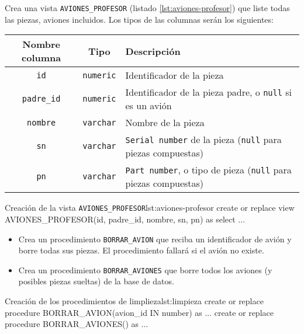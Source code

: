 \begin{homeworkProblem}

  Crea una vista \texttt{AVIONES\_PROFESOR} (listado \ref{lst:aviones-profesor}) que liste todas las piezas, aviones incluidos. Los tipos de las columnas serán los siguientes:
  
  \begin{center}
    \begin{tabular}{|c|c|p{10cm}|}
      \hline
      \textbf{Nombre columna} & \textbf{Tipo} & \textbf{Descripción} \\ 
      \hline
      \texttt{id} & \texttt{numeric} & Identificador de la pieza \\
      \texttt{padre\_id} & \texttt{numeric} & Identificador de la pieza padre, o \texttt{null} si es un avión\\
      \texttt{nombre} & \texttt{varchar} & Nombre de la pieza \\
      \texttt{sn} & \texttt{varchar} & \texttt{Serial number} de la pieza (\texttt{null} para piezas compuestas)\\
      \texttt{pn} & \texttt{varchar} & \texttt{Part number}, o tipo de pieza (\texttt{null} para piezas compuestas)\\
      \hline
    \end{tabular}
  \end{center}

  \begin{listadosql}{Creación de la vista \texttt{AVIONES\_PROFESOR}}{lst:aviones-profesor}
create or replace view AVIONES_PROFESOR(id, padre_id, nombre, sn, pn) as
select ...
\end{listadosql}

\end{homeworkProblem}

\needspace{.25\textheight}
\begin{homeworkProblem}
  \begin{itemize}
  \item Crea un procedimiento \texttt{BORRAR\_AVION} que reciba un identificador de avión y borre
    todas sus piezas. El procedimiento fallará si el avión no existe.
  \item Crea un procedimiento \texttt{BORRAR\_AVIONES} que borre todos los aviones (y posibles piezas
    sueltas) de la base de datos.
  \end{itemize}

  \begin{listadosql}{Creación de los procedimientos de limplieza}{lst:limpieza}
create or replace procedure BORRAR_AVION(avion_id IN number) as ... 
create or replace procedure BORRAR_AVIONES() as ...
\end{listadosql}

\end{homeworkProblem}

